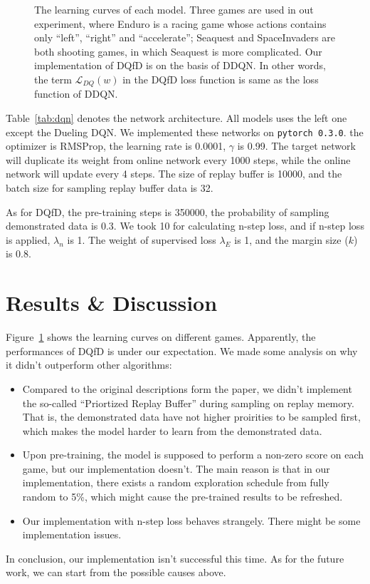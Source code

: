 \documentclass{article}
\begin{document}
\begin{figure}
\caption{The learning curves of each model. Three games are used in out experiment, where Enduro is a racing game whose actions contains only ``left'', ``right'' and ``accelerate''; Seaquest and SpaceInvaders are both shooting games, in which Seaquest is more complicated. Our implementation of DQfD is on the basis of DDQN. In other words, the term $\mathcal{L}_{DQ}(w)$ in the DQfD loss function is same as the loss function of DDQN.}
\label{fig:results}
\end{figure}


Table~\ref{tab:dqn} denotes the network architecture. All models uses the left one except the Dueling DQN. We implemented these networks on \texttt{pytorch 0.3.0}. the optimizer is RMSProp, the learning rate is 0.0001, $\gamma$ is 0.99. The target network will duplicate its weight from online network every 1000 steps, while the online network will update every 4 steps. The size of replay buffer is 10000, and the batch size for sampling replay buffer data is 32.\par

As for DQfD, the pre-training steps is 350000, the probability of sampling demonstrated data is 0.3. We took 10 for calculating n-step loss, and if n-step loss is applied, $\lambda_n$ is 1. The weight of supervised loss $\lambda_E$ is 1, and the margin size ($k$) is 0.8.


\section{Results \& Discussion}



Figure~\ref{fig:results} shows the learning curves on different games. Apparently, the performances of DQfD is under our expectation. We made some analysis on why it didn't outperform other algorithms:
\begin{itemize}
    \item Compared to the original descriptions form the paper, we didn't implement the so-called ``Priortized Replay Buffer'' during sampling on replay memory. That is, the demonstrated data have not higher proirities to be sampled first, which makes the model harder to learn from the demonstrated data.
    \item Upon pre-training, the model is supposed to perform a non-zero score on each game, but our implementation doesn't. The main reason is that in our implementation, there exists a random exploration schedule from fully random to 5\%, which might cause the pre-trained results to be refreshed.
    \item Our implementation with n-step loss behaves strangely. There might be some implementation issues.
\end{itemize}
In conclusion, our implementation isn't successful this time. As for the future work, we can start from the possible causes above.







\renewcommand\refname{References}


\end{document}

